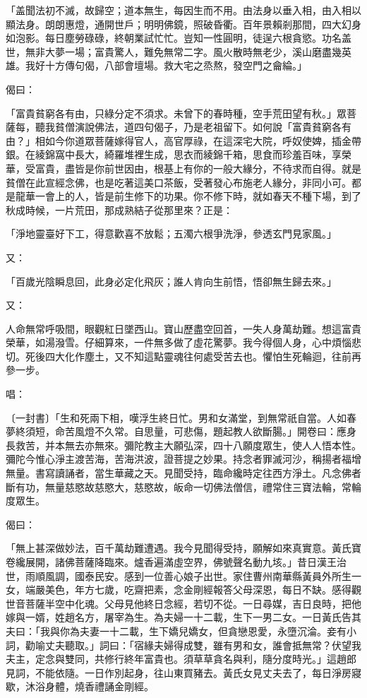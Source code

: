 「盖聞法初不滅，故歸空；道本無生，每因生而不用。由法身以垂入相，由入相以顯法身。朗朗惠燈，通開世戶；明明佛鏡，照破昏衢。百年景賴剎那間，四大幻身如泡影。每日塵勞碌碌，終朝業試忙忙。豈知一性圓明，徒逞六根貪慾。功名盖世，無非大夢一場；富貴驚人，難免無常二字。風火散時無老少，溪山磨盡幾英雄。我好十方傳句偈，八部會壇場。救大宅之烝熬，發空門之龠綸。」

偈曰：

「富貴貧窮各有由，只綠分定不須求。未曾下的春時種，空手荒田望有秋。」眾菩薩每，聽我貧僧演說佛法，道四句偈子，乃是老祖留下。如何說「富貴貧窮各有由？」相如今你道眾菩薩嫁得官人，高官厚祿，在這深宅大院，呼奴使婢，插金帶銀。在綾錦窩中長大，綺羅堆裡生成，思衣而綾錦千箱，思食而珍羞百味，享榮華，受富貴，盡皆是你前世因由，根基上有你的一般大緣分，不待求而自得。就是貧僧在此宣經念佛，也是吃著這美口茶飯，受著發心布施老人緣分，非同小可。都是龍華一會上的人，皆是前生修下的功果。你不修下時，就如春天不種下場，到了秋成時候，一片荒田，那成熟結子從那里來？正是：

「淨地靈臺好下工，得意歡喜不放鬆；五濁六根爭洗淨，參透玄門見家風。」

又：

「百歲光陰瞬息回，此身必定化飛灰；誰人肯向生前悟，悟卻無生歸去來。」

又：

人命無常呼吸間，眼觀紅日墜西山。寶山歷盡空回首，一失人身萬劫難。想這富貴榮華，如湯潑雪。仔細算來，一件無多做了虛花驚夢。我今得個人身，心中煩惱悲切。死後四大化作塵土，又不知這點靈魂往何處受苦去也。懼怕生死輪迴，往前再參一步。

唱：

〔一封書〕「生和死兩下相，嘆浮生終日忙。男和女滿堂，到無常祇自當。人如春夢終須短，命苦風燈不久常。自思量，可悲傷，題起教人欲斷腸。」開卷曰：應身長救苦，并本無去亦無來。彌陀教主大願弘深，四十八願度眾生，使人人悟本性。彌陀今惟心淨主渡苦海，苦海洪波，證菩提之妙果。持念者罪滅河沙，稱揚者福增無量。書寫讀誦者，當生華藏之天。見聞受持，臨命纔時定往西方淨土。凡念佛者斷有功，無量慈愍故慈愍大，慈愍故，皈命一切佛法僧信，禮常住三寶法輪，常輪度眾生。

偈曰：

「無上甚深做妙法，百千萬劫難遭遇。我今見聞得受持，願解如來真實意。黃氏寶卷纔展開，諸佛菩薩降臨來。爐香遍滿虛空界，佛號聲名動九垓。」昔日漢王治世，雨順風調，國泰民安。感到一位善心娘子出世。家住曹州南華縣黃員外所生一女，端嚴美色，年方七歲，吃齋把素，念金剛經報答父母深恩，每日不缺。感得觀世音菩薩半空中化魂。父母見他終日念經，若切不從。一日尋媒，吉日良時，把他嫁與一婿，姓趙名方，屠宰為生。為夫婦一十二載，生下一男二女。一日黃氏告其夫曰：「我與你為夫妻一十二載，生下嬌兒嬌女，但貪戀恩愛，永墮沉淪。妾有小詞，勸喻丈夫聽取。」詞曰：「宿緣夫婦得成雙，雖有男和女，誰會抵無常？伏望我夫主，定念與雙同，共修行終年富貴也。須草草貪名與利，隨分度時光。」這趙郎見詞，不能依隨。一日作別起身，往山東買豬去。黃氏女見丈夫去了，每日淨房寢歇，沐浴身體，燒香禮誦金剛經。

